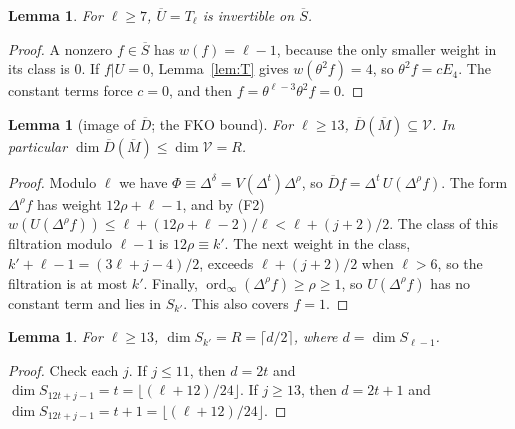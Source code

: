 \documentclass[11pt]{amsart}
\newcommand{\Sb}{\overline{S}}
\newcommand{\Mb}{\overline{M}}
\newcommand{\Ub}{\overline{U}}
\newcommand{\Db}{\overline{D}}
\newcommand{\cV}{\mathcal{V}}
\DeclareMathOperator{\ord}{ord}
\newcommand{\w}{w}
\theoremstyle{plain}
\newtheorem{lemma}[theorem]{Lemma}
\theoremstyle{definition}
\numberwithin{equation}{section}
\begin{document}
\begin{lemma}\label{lem:Uinv}
For $\ell\ge7$, $\Ub=T_\ell$ is invertible on $\Sb$.
\end{lemma}
\begin{proof}
A nonzero $f\in\Sb$ has $\w(f)=\ell-1$, because the only smaller weight in its class is $0$. If $f|U=0$, Lemma~\ref{lem:T}
gives $\w(\theta^2f)=4$, so $\theta^2f=cE_4$. The constant terms force $c=0$, and then $f=\theta^{\ell-3}\theta^2f=0$.
\end{proof}

\begin{lemma}[image of $\Db$; the FKO bound]\label{lem:imageD}
For $\ell\ge13$, $\Db(\Mb)\subseteq\cV$. In particular $\dim\Db(\Mb)\le\dim\cV=R$.
\end{lemma}
\begin{proof}
Modulo $\ell$ we have $\Phi\equiv\Delta^\delta=V(\Delta^t)\Delta^\rho$, so $\Db f=\Delta^t\,U(\Delta^\rho f)$. The form
$\Delta^\rho f$ has weight $12\rho+\ell-1$, and by (F2)
$\w(U(\Delta^\rho f))\le\ell+(12\rho+\ell-2)/\ell<\ell+(j+2)/2$. The class of this filtration modulo $\ell-1$ is
$12\rho\equiv k'$. The next weight in the class, $k'+\ell-1=(3\ell+j-4)/2$, exceeds $\ell+(j+2)/2$ when $\ell>6$, so the
filtration is at most $k'$. Finally, $\ord_\infty(\Delta^\rho f)\ge\rho\ge1$, so $U(\Delta^\rho f)$ has no constant term and
lies in $S_{k'}$. This also covers $f=1$.
\end{proof}

\begin{lemma}\label{lem:dims}
For $\ell\ge13$, $\dim S_{k'}=R=\lceil d/2\rceil$, where $d=\dim S_{\ell-1}$.
\end{lemma}
\begin{proof}
Check each $j$. If $j\le11$, then $d=2t$ and $\dim S_{12t+j-1}=t=\lfloor(\ell+12)/24\rfloor$. If $j\ge13$, then $d=2t+1$
and $\dim S_{12t+j-1}=t+1=\lfloor(\ell+12)/24\rfloor$.
\end{proof}
\end{document}
